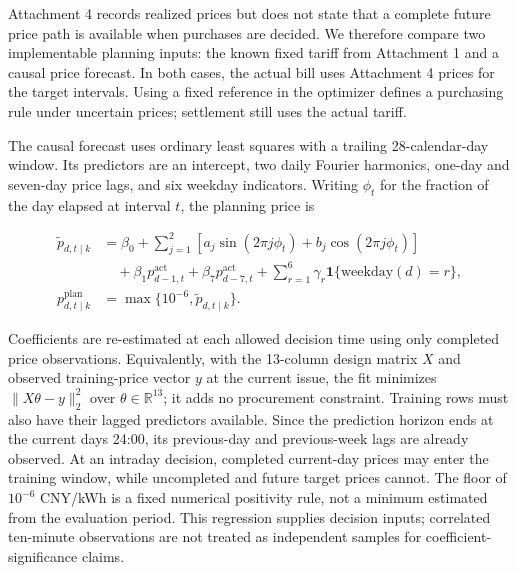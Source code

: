 Attachment 4 records realized prices but does not state that a complete future price path is available when purchases are decided. We therefore compare two implementable planning inputs: the known fixed tariff from Attachment 1 and a causal price forecast. In both cases, the actual bill uses Attachment 4 prices for the target intervals. Using a fixed reference in the optimizer defines a purchasing rule under uncertain prices; settlement still uses the actual tariff.


The causal forecast uses ordinary least squares with a trailing 28-calendar-day window. Its predictors are an intercept, two daily Fourier harmonics, one-day and seven-day price lags, and six weekday indicators. Writing \(\phi_t\) for the fraction of the day elapsed at interval \(t\), the planning price is

\[
\begin{aligned}
\widetilde p_{d,t\mid k}
&=\beta_0+\sum_{j=1}^{2}\left[a_j\sin(2\pi j\phi_t)+b_j\cos(2\pi j\phi_t)\right]\\
&\quad+\beta_1p^{\mathrm{act}}_{d-1,t}+\beta_7p^{\mathrm{act}}_{d-7,t}
+\sum_{r=1}^{6}\gamma_r\mathbf1\{\mathrm{weekday}(d)=r\},\\
p^{\mathrm{plan}}_{d,t\mid k}&=\max\{10^{-6},\widetilde p_{d,t\mid k}\}.
\end{aligned} \tag{10}
\]

Coefficients are re-estimated at each allowed decision time using only completed price observations. Equivalently, with the 13-column design matrix \(X\) and observed training-price vector \(y\) at the current issue, the fit minimizes \(\|X\theta-y\|_2^2\) over \(\theta\in\mathbb R^{13}\); it adds no procurement constraint. Training rows must also have their lagged predictors available. Since the prediction horizon ends at the current day\textquotesingle s 24:00, its previous-day and previous-week lags are already observed. At an intraday decision, completed current-day prices may enter the training window, while uncompleted and future target prices cannot. The floor of \(10^{-6}\) CNY/kWh is a fixed numerical positivity rule, not a minimum estimated from the evaluation period. This regression supplies decision inputs; correlated ten-minute observations are not treated as independent samples for coefficient-significance claims.

